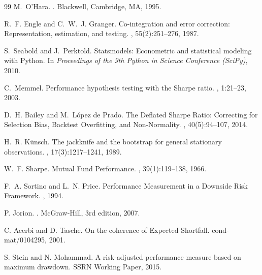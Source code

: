 \documentclass[11pt,a4paper]{article}
\begin{document}
\begin{thebibliography}{99}
M.~O'Hara.
.
\newblock Blackwell, Cambridge, MA, 1995.

R.~F. Engle and C.~W.~J. Granger.
\newblock Co-integration and error correction: Representation, estimation, and testing.
, 55(2):251--276, 1987.

S.~Seabold and J.~Perktold.
\newblock Statsmodels: Econometric and statistical modeling with Python.
\newblock In {\em Proceedings of the 9th Python in Science Conference (SciPy)}, 2010.

C.~Memmel.
\newblock Performance hypothesis testing with the Sharpe ratio.
, 1:21--23, 2003.

D.~H. Bailey and M.~L\'opez de Prado.
\newblock The Deflated Sharpe Ratio: Correcting for Selection Bias, Backtest Overfitting,
and Non-Normality.
, 40(5):94--107, 2014.

H.~R. K\"unsch.
\newblock The jackknife and the bootstrap for general stationary observations.
, 17(3):1217--1241, 1989.

W.~F. Sharpe.
\newblock Mutual Fund Performance.
, 39(1):119--138, 1966.

F.~A. Sortino and L.~N. Price.
\newblock Performance Measurement in a Downside Risk Framework.
, 1994.

P. Jorion.
.
\newblock McGraw-Hill, 3rd edition, 2007.

C. Acerbi and D. Tasche.
\newblock On the coherence of Expected Shortfall.
 cond-mat/0104295, 2001.

S. Stein and N. Mohammad.
\newblock A risk-adjusted performance measure based on maximum drawdown.
\newblock SSRN Working Paper, 2015.

\end{thebibliography}
\end{document}
